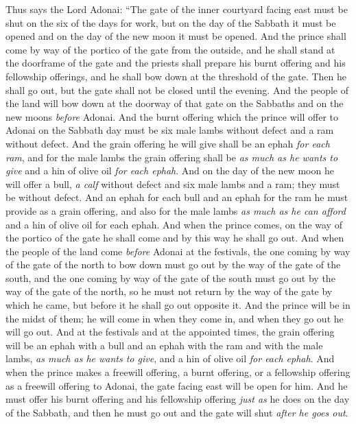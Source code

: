 \begin{biblechapter} %
\verse Thus says the Lord Adonai: “The gate of the inner courtyard facing east must be shut on the six of the days for work, but on the day of the Sabbath it must be opened and on the day of the new moon it must be opened.
\verse And the prince shall come by way of the portico of the gate from the outside, and he shall stand at the doorframe of the gate and the priests shall prepare his burnt offering and his fellowship offerings, and he shall bow down at the threshold of the gate. Then he shall go out, but the gate shall not be closed until the evening.
\verse And the people of the land will bow down at the doorway of that gate on the Sabbaths and on the new moons \textit{before} Adonai.
\verse And the burnt offering which the prince will offer to Adonai on the Sabbath day must be six male lambs without defect and a ram without defect.
\verse And the grain offering he will give shall be an ephah \textit{for each ram}, and for the male lambs the grain offering shall be \textit{as much as he wants to give} and a hin of olive oil \textit{for each ephah}.
\verse And on the day of the new moon he will offer a bull, \textit{a calf} without defect and six male lambs and a ram; they must be without defect.
\verse And an ephah for each bull and an ephah for the ram he must provide as a grain offering, and also for the male lambs \textit{as much as he can afford} and a hin of olive oil for each ephah.
\verse And when the prince comes, on the way of the portico of the gate he shall come and by this way he shall go out.
\verse And when the people of the land come \textit{before} Adonai at the festivals, the one coming by way of the gate of the north to bow down must go out by the way of the gate of the south, and the one coming by way of the gate of the south must go out by the way of the gate of the north, so he must not return by the way of the gate by which he came, but before it he shall go out opposite it.
\verse And the prince will be in the midst of them; he will come in when they come in, and when they go out he will go out.
\verse And at the festivals and at the appointed times, the grain offering will be an ephah with a bull and an ephah with the ram and with the male lambs, \textit{as much as he wants to give}, and a hin of olive oil \textit{for each ephah}.
\verse And when the prince makes a freewill offering, a burnt offering, or a fellowship offering as a freewill offering to Adonai, the gate facing east will be open for him. And he must offer his burnt offering and his fellowship offering \textit{just as} he does on the day of the Sabbath, and then he must go out and the gate will shut \textit{after he goes out}.

\end{biblechapter}
